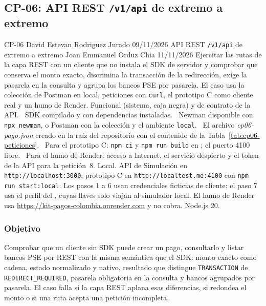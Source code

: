 \subsection{CP-06: API REST \texttt{/v1/api} de extremo a extremo}
\label{sec:cp06}

\FichaCaso
  {CP-06}
  {David Estevan Rodriguez Jurado}
  {09/11/2026}
  {API REST \texttt{/v1/api} de extremo a extremo}
  {Joan Emmanuel Orduz Chia}
  {11/11/2026}
  {Ejercitar las rutas de la capa REST con un cliente que no instala el SDK de servidor y comprobar que conserva el monto exacto, discrimina la transacción de la redirección, exige la pasarela en la consulta y agrupa los bancos PSE por pasarela. El caso usa la colección de Postman en local, peticiones con \texttt{curl}, el prototipo C como cliente real y un humo de Render.}
  {Funcional (sistema, caja negra) y de contrato de la API.}
  {\textbullet\ SDK compilado y  con dependencias instaladas.\newline
   \textbullet\ Newman disponible con \texttt{npx newman}, o Postman con la colección y el ambiente \texttt{local}.\newline
   \textbullet\ El archivo \emph{cp06-pago.json} creado en la raíz del repositorio con el contenido de la Tabla~\ref{tab:cp06-peticiones}.\newline
   \textbullet\ Para el prototipo C: \texttt{npm ci} y \texttt{npm run build} en ; el puerto 4100 libre.\newline
   \textbullet\ Para el humo de Render: acceso a Internet, el servicio despierto y el token de la API para la petición~8.}
  {Local. API de Simulación en \texttt{http://localhost:3000}; prototipo C en \texttt{http://localtest.me:4100} con \texttt{npm run start:local}. Los pasos 1 a 6 usan credenciales ficticias de cliente; el paso 7 usa el perfil del , cuyas llaves solo viajan al simulador local. El humo de Render usa \url{https://kit-pagos-colombia.onrender.com} y no cobra. Node.js 20.}

\subsubsection{Objetivo}

Comprobar que un cliente sin SDK puede crear un pago, consultarlo y listar bancos PSE por REST con la misma semántica que el SDK: monto exacto como cadena, estado normalizado y nativo, resultado que distingue \texttt{TRANSACTION} de \texttt{REDIRECT\_REQUIRED}, pasarela obligatoria en la consulta y bancos agrupados por pasarela. El caso falla si la capa REST aplana esas diferencias, si redondea el monto o si una ruta acepta una petición incompleta.

